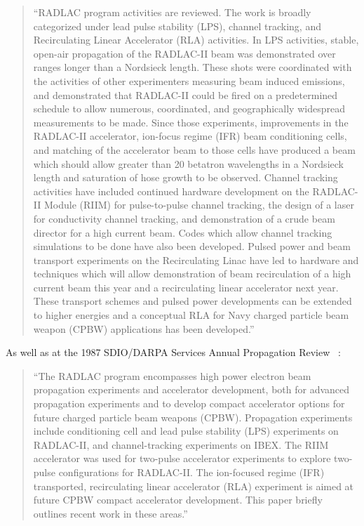 \documentclass [12pt,a4paper,     ]{report} %
\begin{document}
\begin{quote}
``RADLAC program activities are reviewed. The work is broadly categorized under lead pulse stability (LPS), channel tracking, and Recirculating Linear Accelerator (RLA) activities. In LPS activities, stable, open-air propagation of the RADLAC-II beam was demonstrated over ranges longer than a Nordsieck length. These shots were coordinated with the activities of other experimenters measuring beam induced emissions, and demonstrated that RADLAC-II could be fired on a predetermined schedule to allow numerous, coordinated, and geographically widespread measurements to be made. Since those experiments, improvements in the RADLAC-II accelerator, ion-focus regime (IFR) beam conditioning cells, and matching of the accelerator beam to those cells have produced a beam which should allow greater than 20 betatron wavelengths in a Nordsieck length and saturation of hose growth to be observed. Channel tracking activities have included continued hardware development on the RADLAC-II Module (RIIM) for pulse-to-pulse channel tracking, the design of a laser for conductivity channel tracking, and demonstration of a crude beam director for a high current beam. Codes which allow channel tracking simulations to be done have also been developed. Pulsed power and beam transport experiments on the Recirculating Linac have led to hardware and techniques which will allow demonstration of beam recirculation of a high current beam this year and a recirculating linear accelerator next year. These transport schemes and pulsed power developments can be extended to higher energies and a conceptual RLA for Navy charged particle beam weapon (CPBW) applications has been developed.''
\end{quote}

\noindent As well as at the 1987 SDIO/DARPA Services Annual Propagation Review \cite{HASTI1987-}~:

\begin{quote}
``The RADLAC program encompasses high power electron beam propagation experiments and accelerator development, both for advanced propagation experiments and to develop compact accelerator options for future charged particle beam weapons (CPBW). Propagation experiments include conditioning cell and lead pulse stability (LPS) experiments on RADLAC-II, and channel-tracking experiments on IBEX. The RIIM accelerator was used for two-pulse accelerator experiments to explore two-pulse configurations for RADLAC-II. The ion-focused regime (IFR) transported, recirculating linear accelerator (RLA) experiment is aimed at future CPBW compact accelerator development. This paper briefly outlines recent work in these areas.''
\end{quote}
\end{document}
